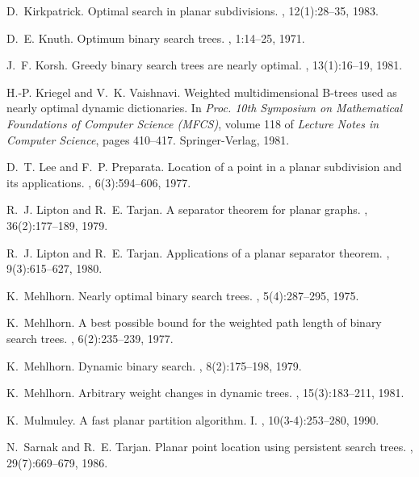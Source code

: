 \documentclass[11pt]{article}
\begin{document}
\begin{thebibliography}{10}
D.~Kirkpatrick.
\newblock Optimal search in planar subdivisions.
, 12(1):28--35, 1983.

D.~E. Knuth.
\newblock Optimum binary search trees.
, 1:14--25, 1971.

J.~F. Korsh.
\newblock Greedy binary search trees are nearly optimal.
, 13(1):16--19, 1981.

H.-P. Kriegel and V.~K. Vaishnavi.
\newblock Weighted multidimensional {B}-trees used as nearly optimal dynamic
  dictionaries.
\newblock In {\em Proc. 10th Symposium on Mathematical Foundations of Computer
  Science (MFCS)}, volume 118 of {\em Lecture Notes in Computer Science}, pages
  410--417. Springer-Verlag, 1981.

D.~T. Lee and F.~P. Preparata.
\newblock Location of a point in a planar subdivision and its applications.
, 6(3):594--606, 1977.

R.~J. Lipton and R.~E. Tarjan.
\newblock A separator theorem for planar graphs.
, 36(2):177--189, 1979.

R.~J. Lipton and R.~E. Tarjan.
\newblock Applications of a planar separator theorem.
, 9(3):615--627, 1980.

K.~Mehlhorn.
\newblock Nearly optimal binary search trees.
, 5(4):287--295, 1975.

K.~Mehlhorn.
\newblock A best possible bound for the weighted path length of binary search
  trees.
, 6(2):235--239, 1977.

K.~Mehlhorn.
\newblock Dynamic binary search.
, 8(2):175--198, 1979.

K.~Mehlhorn.
\newblock Arbitrary weight changes in dynamic trees.
, 15(3):183--211, 1981.

K.~Mulmuley.
\newblock A fast planar partition algorithm. {I}.
, 10(3-4):253--280, 1990.

N.~Sarnak and R.~E. Tarjan.
\newblock Planar point location using persistent search trees.
, 29(7):669--679, 1986.


\end{thebibliography}
\end{document}
